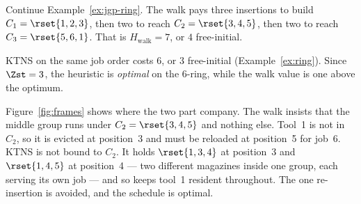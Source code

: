 \begin{example}\label{ex:frames-ring}
Continue Example~\ref{ex:jgp-ring}. The walk pays three insertions to build
$C_1 = \rset{1,2,3}$, then two to reach $C_2 = \rset{3,4,5}$, then two to reach
$C_3 = \rset{5,6,1}$. That is $H_{\mathrm{walk}} = 7$, or $4$ free-initial.

KTNS on the same job order costs $6$, or $3$ free-initial
(Example~\ref{ex:ring}). Since $\Zst = 3$, the heuristic is \emph{optimal} on the
$6$-ring, while the walk value is one above the optimum.

Figure~\ref{fig:frames} shows where the two part company. The walk insists that
the middle group runs under $C_2 = \rset{3,4,5}$ and nothing else. Tool~1 is not
in $C_2$, so it is evicted at position~3 and must be reloaded at position~5 for
job~6. KTNS is not bound to $C_2$. It holds $\rset{1,3,4}$ at position~3 and
$\rset{1,4,5}$ at position~4 --- two different magazines inside one group, each
serving its own job --- and so keeps tool~1 resident throughout. The one
re-insertion is avoided, and the schedule is optimal.
\end{example}


